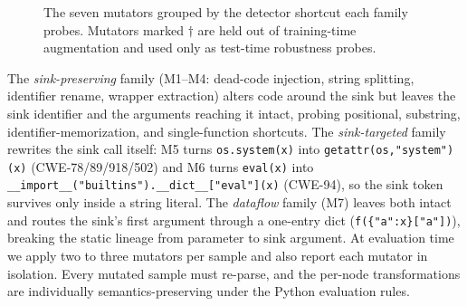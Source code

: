 \documentclass[conference]{IEEEtran}
\begin{document}
\begin{figure}[t]
\centering
{}
\caption{The seven mutators grouped by the detector shortcut each family
probes. Mutators marked $\dagger$ are held out of training-time
augmentation and used only as test-time robustness probes.}
\label{fig:mutator-tax}
\end{figure}

The \emph{sink-preserving} family (M1--M4: dead-code injection, string
splitting, identifier rename, wrapper extraction) alters code around the
sink but leaves the sink identifier and the arguments reaching it
intact, probing positional, substring, identifier-memorization, and
single-function shortcuts. The \emph{sink-targeted} family rewrites the
sink call itself: M5 turns \texttt{os.system(x)} into
\texttt{getattr(os,"system")(x)} (CWE-78/89/918/502) and M6 turns
\texttt{eval(x)} into \texttt{\_\_import\_\_("builtins").\_\_dict\_\_["eval"](x)}
(CWE-94), so the sink token survives only inside a string literal. The
\emph{dataflow} family (M7) leaves both intact and routes the sink's
first argument through a one-entry dict (\texttt{f(\{"a":x\}["a"])}),
breaking the static lineage from parameter to sink argument. At
evaluation time we apply two to three mutators per sample and also report
each mutator in isolation. Every mutated sample must re-parse, and the
per-node transformations are individually semantics-preserving under the
Python evaluation rules.
\end{document}

